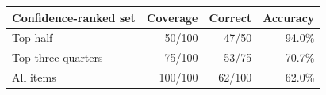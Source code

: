 \begin{tabular}{lrrr}
\toprule
Confidence-ranked set & Coverage & Correct & Accuracy \\
\midrule
Top half & 50/100 & 47/50 & 94.0\% \\
Top three quarters & 75/100 & 53/75 & 70.7\% \\
All items & 100/100 & 62/100 & 62.0\% \\
\bottomrule
\end{tabular}
